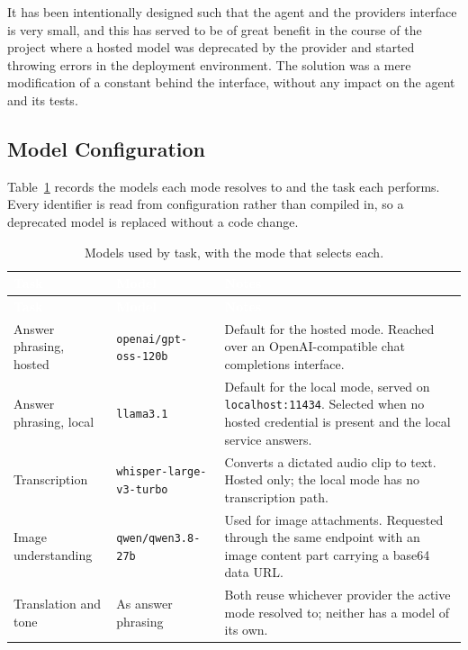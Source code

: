 It has been intentionally designed such that the agent and the providers interface is very small, and this has served to be of great benefit in the course of the project where a hosted model was deprecated by the provider and started throwing errors in the deployment environment. The solution was a mere modification of a constant behind the interface, without any impact on the agent and its tests.

\subsection{Model Configuration}
\label{sec:modelconfig}

Table~\ref{tab:models} records the models each mode resolves to and the task each performs.
Every identifier is read from configuration rather than compiled in, so a deprecated model
is replaced without a code change.

\begin{longtable}{|p{}|p{}|p{}|}
\caption{Models used by task, with the mode that selects each.}\label{tab:models}\\
\hline
\rowcolor{myblue}\textcolor{white}{\textbf{Task}} & \textcolor{white}{\textbf{Model}} & \textcolor{white}{\textbf{Notes}} \\
\hline
\endfirsthead
\hline
\rowcolor{myblue}\textcolor{white}{\textbf{Task}} & \textcolor{white}{\textbf{Model}} & \textcolor{white}{\textbf{Notes}} \\
\hline
\endhead
Answer phrasing, hosted & \texttt{openai/gpt-oss-120b} & Default for the hosted mode. Reached over an OpenAI-compatible chat completions interface. \\ \hline
Answer phrasing, local & \texttt{llama3.1} & Default for the local mode, served on \texttt{localhost:11434}. Selected when no hosted credential is present and the local service answers. \\ \hline
Transcription & \texttt{whisper-large-v3-turbo} & Converts a dictated audio clip to text. Hosted only; the local mode has no transcription path. \\ \hline
Image understanding & \texttt{qwen/qwen3.8-27b} & Used for image attachments. Requested through the same endpoint with an image content part carrying a base64 data URL. \\ \hline
Translation and tone & As answer phrasing & Both reuse whichever provider the active mode resolved to; neither has a model of its own. \\ \hline
\end{longtable}

